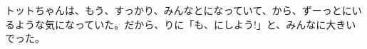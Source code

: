 \documentclass[12pt,a4paper,oneside,openany]{book}
\begin{document}
\tableofcontents

トットちゃんは、もう、すっかり、みんなとになっていて、から、ずーっとにいるような気になっていた。だから、りに「も、にしよう!」と、みんなに大きいでった。
\end{document}

